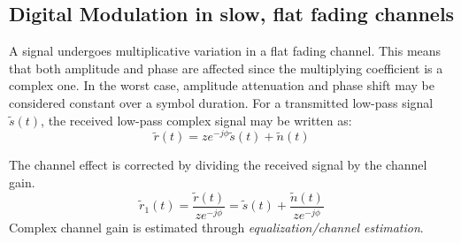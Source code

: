 \subsection{Digital Modulation in slow, flat fading channels}
A signal undergoes multiplicative variation in a flat fading channel. This means that both amplitude and phase are affected since the multiplying coefficient is a complex one. In the worst case, amplitude attenuation and phase shift may be considered constant over a symbol duration. For a transmitted low-pass signal \(\tilde{s}(t)\), the received low-pass complex signal may be written as:
\begin{equation}
	\tilde{r}(t) = ze^{-j\phi}\tilde{s}(t) + \tilde{n}(t)
\end{equation}
\begin{mathDef}
\end{mathDef}
The channel effect is corrected by dividing the received signal by the channel gain.
\begin{equation}
	\tilde{r}_1(t) = \frac{\tilde{r}(t)}{ze^{-j\phi}} = \tilde{s}(t) + \frac{\tilde{n}(t)}{ze^{-j\phi}}
\end{equation}
Complex channel gain is estimated through \emph{equalization/channel estimation}.
